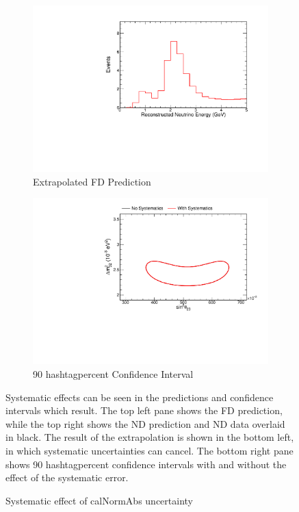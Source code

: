 {\begin{figure}
\begin{center}
\begin{subfigure}[c]{0.49\textwidth}
\includegraphics[width=\textwidth]{figures/systs/prediction/fd_extrap_prediction_calNormAbs.pdf}
\caption*{Extrapolated FD Prediction}
\end{subfigure}
\begin{subfigure}[c]{0.49\textwidth}
\includegraphics[width=\textwidth]{figures/systs/prediction/fd_extrap_contour_calNormAbs.pdf}
\caption*{90 hashtagpercent Confidence Interval}
\end{subfigure}
\end{center}
\caption{Systematic effect of calNormAbs uncertainty}{
Systematic effects can be seen in the predictions and confidence intervals
which result.
The top left pane shows the FD prediction, while the top right shows the
ND prediction and ND data overlaid in black.
The result of the extrapolation is shown in the bottom left, in which
systematic uncertainties can cancel.
The bottom right pane shows 90 hashtagpercent confidence intervals with and without
the effect of the systematic error.}
\label{syst_fig_calNormAbs}


\end{figure}}

